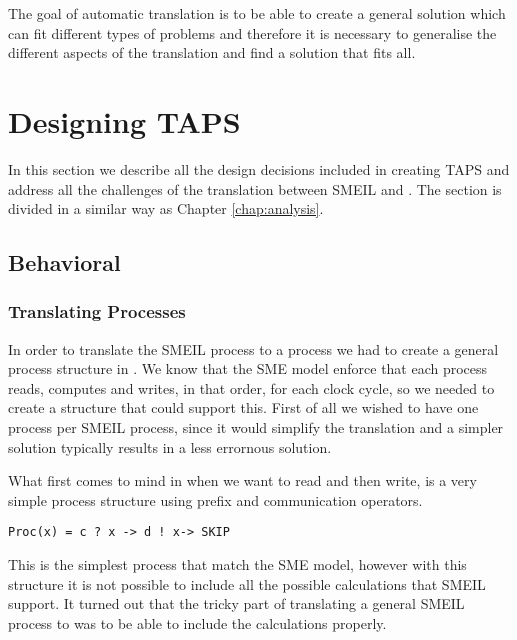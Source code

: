 The goal of automatic translation is to be able to create a general solution which can fit different types of problems and therefore it is necessary to generalise the different aspects of the translation and find a solution that fits all.
\section{Designing TAPS}

In this section we describe all the design decisions included in creating TAPS and address all the challenges of the translation between SMEIL and \cspm{}. The section is divided in a similar way as Chapter \ref{chap:analysis}.
\subsection{Behavioral}

\subsubsection{Translating Processes}
In order to translate the SMEIL process to a \cspm{} process we had to create a general process structure in \cspm{}. We know that the SME model enforce that each process reads, computes and writes, in that order, for each clock cycle, so we needed to create a \cspm{} structure that could support this. First of all we wished to have one \cspm{} process per SMEIL process, since it would simplify the translation and a simpler solution typically results in a less errornous solution.

What first comes to mind in \cspm{} when we want to read and then write, is a very simple process structure using prefix and communication operators.
\begin{verbatim}
Proc(x) = c ? x -> d ! x-> SKIP
\end{verbatim}
This is the simplest \cspm{} process that match the SME model, however with this structure it is not possible to include all the possible calculations that SMEIL support. It turned out that the tricky part of translating a general SMEIL process to \cspm{} was to be able to include the calculations properly.

